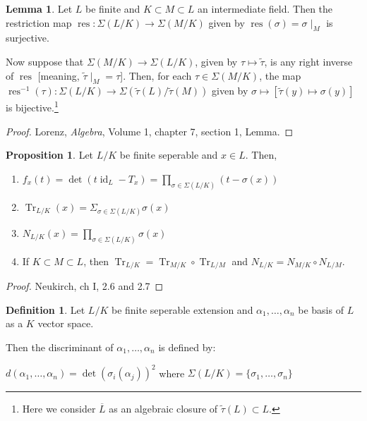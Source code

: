 \documentclass[openany]{amsbook}
\numberwithin{section}{chapter}
\theoremstyle{definition}
\newtheorem*{definition}{Definition}
\newtheorem{proposition}[theorem]{Proposition}
\newtheorem{lemma}[theorem]{Lemma}
\newcommand{\Tr}{\operatorname{Tr}}
\newcommand{\id}{\operatorname{id}}
\begin{document}
\begin{lemma}
Let \(L \) be finite and \(K \subset M \subset L\) an intermediate field. Then the restriction map \(\operatorname{res} : \Sigma (L / K) \to \Sigma (M / K)\) given by \(\operatorname{res}(\sigma) = \sigma \mid_M\)  is surjective.

Now suppose that \(\Sigma (M / K) \to \Sigma (L / K)\), given by \(\tau \mapsto \tilde{\tau}\), is any right inverse of \(\operatorname{res}\) [meaning, \(\tilde{\tau } \mid _M = \tau\)]. Then, for each \(\tau \in \Sigma(M / K)\), the map \(\operatorname{res}^{-1} (\tau) : \Sigma (L / K) \to \Sigma (\tilde{\tau}(L) / \tilde{\tau}(M))\) given by \(\sigma \mapsto [\tilde{\tau}(y) \mapsto \sigma(y)]\)  is bijective.\footnote{Here we consider \(\overline{L}\) as an algebraic closure of \(\tilde{\tau}(L) \subset L\).}
\end{lemma}

\begin{proof}
    Lorenz, \emph{Algebra}, Volume 1, chapter 7, section 1, Lemma.
\end{proof}

\begin{proposition}
    Let \(L / K\) be finite seperable and \(x\in L\). Then,
    
    \begin{enumerate}[label=\roman*)]
        \item  \(f_x(t) = \det (t \id_L - T_x) = \prod_{\sigma \in \Sigma (L / K)}^{}(t - \sigma(x)) \)
        
        \item \(\Tr_{L / K}(x) = \Sigma_{\sigma \in \Sigma (L / K)} \sigma(x)\) 
        
        \item \(N_{L / K}(x) = \prod_{\sigma \in \Sigma (L / K)} \sigma (x)\) 
        
        \item If \(K \subset M \subset L\), then \(\Tr_{L / K} = \Tr_{M / K} \circ \Tr_{L / M}\) and \(N_{L / K} = N_{M / K} \circ N_{L / M}\). 

    \end{enumerate}  

\end{proposition}

\begin{proof}
    Neukirch, ch I, 2.6 and 2.7
\end{proof}

\begin{definition}
    Let \(L /K\) be finite seperable extension and \(\alpha_1, \dots , \alpha_n\) be basis of \(L\) as a \(K\) vector space.

    Then the discriminant of \(\alpha_1, \dots ,\alpha_n\) is defined by:

    \(d(\alpha_1, \dots , \alpha_n) = \det(\sigma_i(\alpha_j))^2\) where \(\Sigma (L / K) = \{ \sigma_1, \dots , \sigma_n \} \) 
\end{definition}
\end{document}
